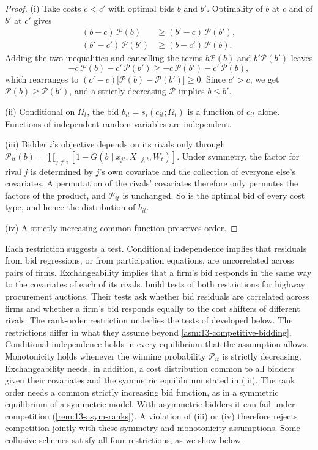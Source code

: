 \begin{proof}
(i) Take costs $c < c'$ with optimal bids $b$ and $b'$. Optimality of $b$ at $c$ and of $b'$ at $c'$ gives
\begin{align*}
  (b - c)\,\mathcal{P}(b) &\geq (b' - c)\,\mathcal{P}(b'),\\
  (b' - c')\,\mathcal{P}(b') &\geq (b - c')\,\mathcal{P}(b).
\end{align*}
Adding the two inequalities and cancelling the terms $b\mathcal{P}(b)$ and $b'\mathcal{P}(b')$ leaves
\begin{equation*}
  -c\,\mathcal{P}(b) - c'\,\mathcal{P}(b') \geq -c\,\mathcal{P}(b') - c'\,\mathcal{P}(b),
\end{equation*}
which rearranges to $(c' - c)\bigl[\mathcal{P}(b) - \mathcal{P}(b')\bigr] \geq 0$. Since $c' > c$, we get
$\mathcal{P}(b) \geq \mathcal{P}(b')$, and a strictly decreasing $\mathcal{P}$ implies $b \leq b'$.

(ii) Conditional on $\Omega_t$, the bid $b_{it} = s_i(c_{it};\Omega_t)$ is a function of $c_{it}$ alone. Functions
of independent random variables are independent.

(iii) Bidder $i$'s objective depends on its rivals only through $\mathcal{P}_{it}(b) = \prod_{j\neq i}[1 -
G(b \mid x_{jt}, X_{-j,t}, W_t)]$. Under symmetry, the factor for rival $j$ is determined by $j$'s own covariate and
the collection of everyone else's covariates. A permutation of the rivals' covariates therefore only permutes the
factors of the product, and $\mathcal{P}_{it}$ is unchanged. So is the optimal bid of every cost type, and hence the
distribution of $b_{it}$.

(iv) A strictly increasing common function preserves order.
\end{proof}

Each restriction suggests a test. Conditional independence implies that residuals from bid regressions, or from
participation equations, are uncorrelated across pairs of firms. Exchangeability implies that a firm's bid responds
in the same way to the covariates of each of its rivals. \citet{BajariYe2003} build tests of both restrictions for
highway procurement auctions. Their tests ask whether bid residuals are correlated across firms and whether a
firm's bid responds equally to the cost shifters of different rivals. The
rank-order restriction underlies the tests of \citet{PorterZona1993} developed below. The restrictions differ in
what they assume beyond \cref{asm:13-competitive-bidding}. Conditional independence holds in every equilibrium
that the assumption allows. Monotonicity holds whenever the winning probability $\mathcal{P}_{it}$ is strictly
decreasing. Exchangeability needs, in addition, a cost distribution common to all bidders given their covariates
and the symmetric equilibrium stated in (iii). The rank order needs a common strictly increasing bid function, as in a symmetric equilibrium of
a symmetric model. With asymmetric bidders it can fail under competition (\cref{rem:13-asym-ranks}). A violation of
(iii) or (iv) therefore rejects competition jointly with these symmetry and monotonicity assumptions. Some collusive schemes satisfy all four
restrictions, as we show below.

